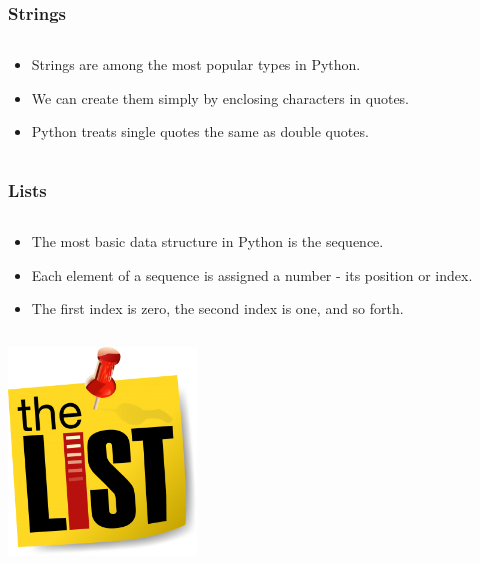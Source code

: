 \documentclass{beamer}
\begin{document}
\begin{frame}
	\frametitle{Strings}
	\begin{columns}[c]
		\begin{column}{30cm}
			\vspace{.1cm}
			\begin{itemize}
				\justifying
				\item Strings are among the most popular types in Python.
				\item We can create them simply by enclosing characters in quotes.
				\item Python treats single quotes the same as double quotes.
			\end{itemize}
		\end{column}
	\end{columns}
\end{frame}

\begin{frame}
	\frametitle{Lists}
	\begin{columns}[c]
		\begin{column}{30cm}
			\vspace{.1cm}
			\begin{itemize}
				\justifying
				\item The most basic data structure in Python is the sequence.
				\item Each element of a sequence is assigned a number - its position or index.
				\item The first index is zero, the second index is one, and so forth.
			\end{itemize}
		\end{column}
	\end{columns}
	\vspace{.5cm}
	\hspace*{5.5cm} \includegraphics[width=5cm]{figs/list.jpg}	
\end{frame}
\end{document}

